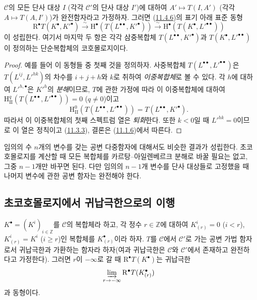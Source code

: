 \begin{proposition}[11.4.7]
\label{0.11.4.7-fr}
$\mathcal C$의 모든 단사 대상 $I$ (각각 $\mathcal C'$의 단사 대상
$I'$)에 대하여 $A'\mapsto T(I,A')$ (각각 $A\mapsto T(A,I')$)가
완전함자라고 가정하자. 그러면 (\hyperref[0.11.4.6-fr]{11.4.6})의
표기 아래 표준 동형
\[
  \label{0.11.4.7.1-fr}
  \mathrm R^\bullet T(K^\bullet,K'^\bullet)
  \xrightarrow{\sim}\mathrm H^\bullet(T(L^{\bullet\bullet},K'^\bullet))
  \xrightarrow{\sim}\mathrm H^\bullet(T(K^\bullet,L'^{\bullet\bullet}))
  \tag{11.4.7.1}
\]
이 성립한다. 여기서 마지막 두 항은 각각 삼중복합체
$T(L^{\bullet\bullet},K'^\bullet)$과
$T(K^\bullet,L'^{\bullet\bullet})$이 정의하는 단순복합체의
코호몰로지이다.
\end{proposition}

\begin{proof}
예를 들어 이 동형들 중 첫째 것을 정의하자. 사중복합체
$T(L^{\bullet\bullet},L'^{\bullet\bullet})$은
$T(L^{ij},L'^{hk})$의 차수를 $i+j+h$와 $k$로 취하여
\emph{이중복합체}로 볼 수 있다. 각 $h$에 대하여
$L'^{h,\bullet}$은 $K'^h$의 \emph{분해}이므로, $T$에 관한 가정에 따라
이 이중복합체에 대하여
$\mathrm H_{\mathrm{II}}^q(T(L^{\bullet\bullet},L'^{\bullet\bullet}))=0$
($q\neq0$)이고
\[
\mathrm H_{\mathrm{II}}^0(T(L^{\bullet\bullet},L'^{\bullet\bullet}))
=T(L^{\bullet\bullet},K'^\bullet).
\]
따라서 이 이중복합체의 첫째 스펙트럼 열은 \emph{퇴화}한다. 또한
$k<0$일 때 $L'^{hk}=0$이므로 이 열은 정칙이고
(\hyperref[0.11.3.3-fr]{11.3.3}), 결론은
(\hyperref[0.11.1.6-fr]{11.1.6})에서 따른다.
\end{proof}

임의의 수 $n$개의 변수를 갖는 공변 다중함자에 대해서도 비슷한 결과가
성립한다. 초코호몰로지를 계산할 때 모든 복합체를 카르탕--아일렌베르크
분해로 바꿀 필요는 없고, 그중 $n-1$개만 바꾸면 된다. 다만 임의의
$n-1$개 변수를 단사 대상들로 고정했을 때 나머지 변수에 관한 공변
함자는 완전해야 한다.

\subsection{초코호몰로지에서 귀납극한으로의 이행}
\label{subsection:0.11.5-ko}

\begin{lemma}[11.5.1]
\label{0.11.5.1-ko}
$K^\bullet=(K^i)_{i\in\mathbb Z}$를 $\mathcal C$의 복합체라 하고, 각 정수
$r\in\mathbb Z$에 대하여 $K_{(r)}^i=0$ ($i<r$),
$K_{(r)}^i=K^i$ ($i\geq r$)인 복합체를 $K_{(r)}^\bullet$이라 하자.
$T$를 $\mathcal C$에서 $\mathcal C'$로 가는 공변 가법 함자로서
귀납극한과 가환하는 함자라 하자(여과 귀납극한은 $\mathcal C$와
$\mathcal C'$에서 존재하고 완전하다고 가정한다). 그러면 $r$이
$-\infty$로 갈 때 $\mathrm R^\bullet T(K^\bullet)$는 귀납극한
\[
  \varinjlim_{r\to-\infty}\mathrm R^\bullet T(K_{(r)}^\bullet)
\]
과 동형이다.
\end{lemma}

